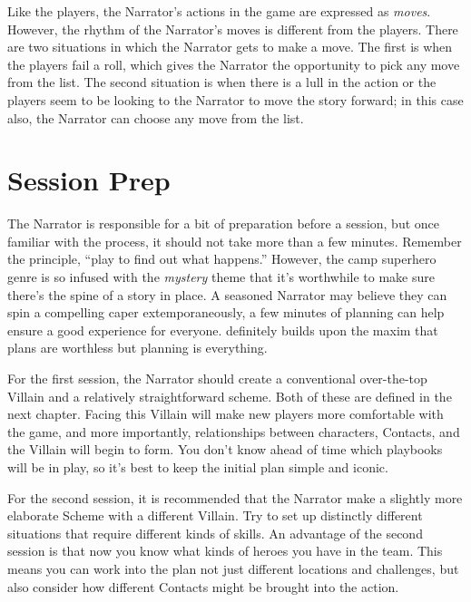 \documentclass[letterpaper]{report}
\begin{document}
Like the players, the Narrator's actions in the game are expressed
as \emph{moves}. However, the rhythm of the Narrator's moves is
different from the players.
There are two situations in which the Narrator gets to make a move.
The first is when the players fail a roll, which gives the Narrator
the opportunity to pick any move from the list.
The second situation is when there is a lull in the action or the
players seem to be looking to the Narrator to move the story forward;
in this case also, the Narrator can choose any move from the list.

\newenvironment{narratormove}[2]
{\subsection*{#1} #2}
{}



\section{Session Prep}
\label{sec:session-prep}

The Narrator is responsible for a bit of preparation before
a session, but once familiar with the process, it should not take
more than a few minutes.
Remember the principle, ``play to find out what happens.''
However, the camp superhero genre is so
infused with the \textit{mystery} theme that it's worthwhile
to make sure there's the spine of a story in place.
A seasoned Narrator may believe they can spin a compelling caper
extemporaneously, a few minutes of planning can help ensure a good
experience for everyone. \kapow{} definitely builds upon the
maxim that plans are worthless but planning is everything.

For the first session, the Narrator should create a conventional
over-the-top Villain and a relatively straightforward scheme.
Both of these are defined in the next chapter.
Facing this Villain will make new players more comfortable
with the game, and more importantly, relationships between characters,
Contacts, and the Villain will begin to form.
You don't know ahead of time which playbooks will be in play,
so it's best to keep the initial plan simple and iconic.

For the second session, it is recommended that the Narrator make
a slightly more elaborate Scheme with a different Villain. Try to
set up distinctly different situations that require different kinds
of skills. An advantage of the second session is that now you know
what kinds of heroes you have in the team. This means you can work
into the plan not just different locations and challenges, but also
consider how different Contacts might be brought into the action.
\end{document}

